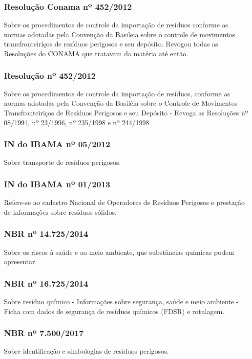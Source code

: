 \begin{subapend}
\begin{subsubapend}
		\subsubsection{Resolução Conama nº 452/2012}
		Sobre os procedimentos de controle da importação de resíduos conforme as normas adotadas pela Convenção da Basileia sobre o controle de movimentos transfronteiriços de resíduos perigosos e seu depósito. Revogou todas as Resoluções do CONAMA que tratavam da matéria até então.
	
		\subsubsection{Resolução nº 452/2012}
		Sobre os procedimentos de controle da importação de resíduos, conforme as normas adotadas pela Convenção da Basiléia sobre o Controle de Movimentos Transfronteiriços de Resíduos Perigosos e seu Depósito - Revoga as Resoluções nº 08/1991, nº 23/1996, nº 235/1998 e nº 244/1998.
	
		\subsubsection{IN do IBAMA nº 05/2012}
		Sobre transporte de resíduos perigosos.

		\subsubsection{IN do IBAMA nº 01/2013}
		Refere-se ao cadastro Nacional de Operadores de Resíduos Perigosos e prestação de informações sobre resíduos sólidos.
		
		\subsubsection{NBR nº 14.725/2014}
		Sobre os riscos à saúde e ao meio ambiente, que substâncias químicas podem apresentar.
		
		\subsubsection{NBR nº 16.725/2014}
		Sobre resíduo químico - Informações sobre segurança, saúde e meio ambiente - Ficha com dados de segurança de resíduos químicos (FDSR) e rotulagem.
		
		\subsubsection{NBR nº 7.500/2017}
		Sobre identificação e simbologias de resíduos perigosos.	
		

\end{subsubapend}
\end{subapend}
